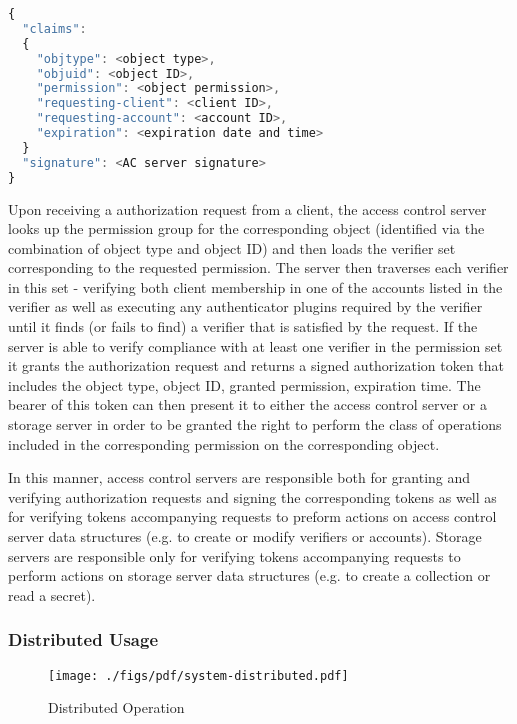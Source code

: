 \begin{lstlisting}[float,
    language=JavaScript,
    caption={Authorization Token Contents},
    label=lst:tutamen:token]
{
  "claims":
  {
    "objtype": <object type>,
    "objuid": <object ID>,
    "permission": <object permission>,
    "requesting-client": <client ID>,
    "requesting-account": <account ID>,
    "expiration": <expiration date and time>
  }
  "signature": <AC server signature>
}
\end{lstlisting}

Upon receiving a authorization request from a client, the access
control server looks up the permission group for the corresponding
object (identified via the combination of object type and object ID)
and then loads the verifier set corresponding to the requested
permission. The server then traverses each verifier in this set -
verifying both client membership in one of the accounts listed in the
verifier as well as executing any authenticator plugins required by
the verifier until it finds (or fails to find) a verifier that is
satisfied by the request. If the server is able to verify compliance
with at least one verifier in the permission set it grants the
authorization request and returns a signed authorization token that
includes the object type, object ID, granted permission, expiration
time. The bearer of this token can then present it to either the
access control server or a storage server in order to be granted the
right to perform the class of operations included in the corresponding
permission on the corresponding object.

In this manner, access control servers are responsible both for
granting and verifying authorization requests and signing the
corresponding tokens as well as for verifying tokens accompanying
requests to preform actions on access control server data structures
(e.g. to create or modify verifiers or accounts). Storage servers are
responsible only for verifying tokens accompanying requests to perform
actions on storage server data structures (e.g. to create a collection
or read a secret).

\subsubsection{Distributed Usage}

\begin{figure}[th]
  \centering
  \texttt{[image: ./figs/pdf/system-distributed.pdf]}
  \caption{Distributed Operation}
  \label{fig:tutamen:systemdistributed}
\end{figure}

